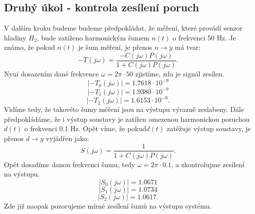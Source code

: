\documentclass[a4paper,11pt]{article}
\begin{document}
\newpage 
\subsection{Druhý úkol - kontrola zesílení poruch}\label{sec:2_2} 
V dalším kroku budeme budeme předpokládat, že měření, které provádí senzor hladiny $ H_{2} $, bude zatíženo harmonickým šumem $ n\left ( t \right ) $ o frekvenci 50 Hz. Je známo, že pokud $ n\left ( t \right ) $ je šum měření, je přenos $ n\rightarrow y $ má tvar:
\begin{equation}
-T\left ( j\omega  \right ) = \frac{-C\left ( j\omega  \right )P\left (j\omega  \right )}{1+ C\left ( j\omega  \right )P\left ( j\omega  \right )}.
\end{equation}
Nyní dosazením dané frekvence $ \omega = 2\pi \cdot 50 $ zjistíme, zda je signál zesílen.
$$ \left | -T_{0}\left ( j\omega  \right ) \right | = 1.7618\cdot 10^{-9}$$
$$ \left | -T_{1}\left ( j\omega  \right ) \right | = 1.9380\cdot 10^{-9}$$
$$ \left | -T_{2}\left ( j\omega  \right ) \right | = 1.6153\cdot 10^{-9}.$$
Vidíme tedy, že takovéto šumy měření jsou na výstupu výrazně zeslabeny.
Dále předpokládáme, že i výstup soustavy je zatížen omezenou harmonickou poruchou $ d\left ( t \right ) $ o frekvenci 0.1 Hz. Opět víme, že pokud$ d\left ( t \right ) $ zatěžuje výstup soustavy, je přenos $ d\rightarrow y $ vyjádřen jako:
\begin{equation}
S\left ( j\omega  \right ) = \frac{1}{1+ C\left ( j\omega  \right )P\left ( j\omega  \right )}.
\end{equation}
Opět dosadíme danou frekvenci šumu, tedy $ \omega = 2\pi \cdot 0.1 $, a zkontrolujme zesílení na výstupu.
$$ \left | S_{0}\left ( j\omega  \right ) \right | = 1.0671 $$
$$ \left | S_{1}\left ( j\omega  \right ) \right | = 1.0734 $$
$$ \left | S_{2}\left ( j\omega  \right ) \right | = 1.0617.$$
Zde již naopak pozorujeme mírné zesílení
šumů na výstupu systému.
\end{document}
